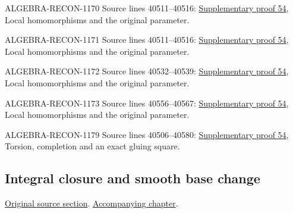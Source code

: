 \begin{AlgebraSourceRoutes}
\item[ALGEBRA-RECON-1170] Source lines 40511--40516: \hyperlink{algebra_local_integral_notes_20260928}{Supplementary proof 54}, Local homomorphisms and the original parameter.
\item[ALGEBRA-RECON-1171] Source lines 40511--40516: \hyperlink{algebra_local_integral_notes_20260928}{Supplementary proof 54}, Local homomorphisms and the original parameter.
\item[ALGEBRA-RECON-1172] Source lines 40532--40539: \hyperlink{algebra_local_integral_notes_20260928}{Supplementary proof 54}, Local homomorphisms and the original parameter.
\item[ALGEBRA-RECON-1173] Source lines 40556--40567: \hyperlink{algebra_local_integral_notes_20260928}{Supplementary proof 54}, Local homomorphisms and the original parameter.
\item[ALGEBRA-RECON-1179] Source lines 40506--40580: \hyperlink{algebra_local_integral_notes_20260928}{Supplementary proof 54}, Torsion, completion and an exact gluing square.
\end{AlgebraSourceRoutes}

\subsection{Integral closure and smooth base change}
\hypertarget{algebra-source-section-integral-closure-smooth-base-change}{}
\noindent\href{https://github.com/stacks/stacks-project/blob/a04446e57ec1fbc252a871afcec7752fb2807b14/algebra.tex\#L40586}{Original source section}. \href{algebra.pdf\#nameddest=section-integral-closure-smooth-base-change}{Accompanying chapter}.

